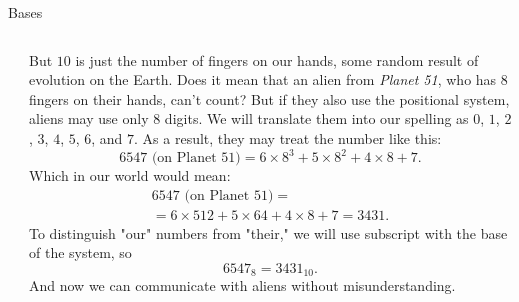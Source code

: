 \documentclass[9pt,aspectratio=169]{beamer}
\begin{document}
\begin{frame}{Bases}
\begin{columns}[T]
\begin{column}{0.5\textwidth}
    \end{column}
    \begin{column}{0.5\textwidth}
      But $10$ is just the number of fingers on our hands, some random result of evolution on the Earth. Does it mean that an alien from \emph{Planet 51}, who has $8$ fingers on their hands, can't count? But if they also use the positional system, aliens may use only $8$ digits. We will translate them into our spelling as $0$, $1$, $2$, $3$, $4$, $5$, $6$, and $7$. As a result, they may treat the number like this:
      \[ 6547 \text{ (on Planet 51)} = 6 \times 8^3 + 5 \times 8^2 + 4 \times 8 + 7. \]
      Which in our world would mean:
      \begin{multline*}
         6547 \text{ (on Planet 51)} = \\ =6 \times 512 + 5 \times 64 + 4 \times 8 + 7 = 3431.
      \end{multline*}
      To distinguish "our" numbers from "their," we will use subscript with the base of the system, so
      \[ 6547_{8} = 3431_{10}. \]
      And now we can communicate with aliens without misunderstanding.
    \end{column}
  \end{columns}
\end{frame}
\end{document}
